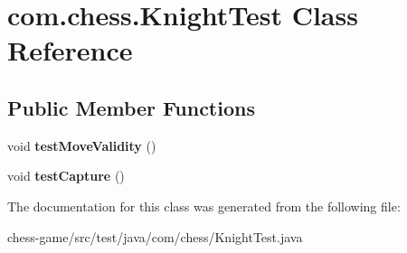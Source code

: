 \hypertarget{classcom_1_1chess_1_1_knight_test}{}\section{com.\+chess.\+Knight\+Test Class Reference}
\label{classcom_1_1chess_1_1_knight_test}
\subsection*{Public Member Functions}
\begin{DoxyCompactItemize}
\item 
\mbox{\label{classcom_1_1chess_1_1_knight_test_a7b941262df7a5a3f0f808a549f73d71e}} 
void {\bfseries test\+Move\+Validity} ()
\item 
\mbox{\label{classcom_1_1chess_1_1_knight_test_acb204848830227af22f6aad491708896}} 
void {\bfseries test\+Capture} ()
\end{DoxyCompactItemize}


The documentation for this class was generated from the following file\+:\begin{DoxyCompactItemize}
\item 
chess-\/game/src/test/java/com/chess/Knight\+Test.\+java\end{DoxyCompactItemize}
